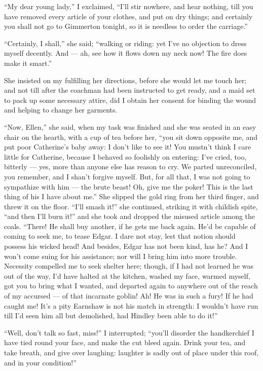 \par “My dear young lady,” I exclaimed, “I'll stir nowhere, and hear nothing, till you have removed every article of your clothes, and put on dry things; and certainly you shall not go to Gimmerton tonight, so it is needless to order the carriage.”
\par “Certainly, I shall,” she said; “walking or riding: yet I've no objection to dress myself decently. And — ah, see how it flows down my neck now! The fire does make it smart.”
\par She insisted on my fulfilling her directions, before she would let me touch her; and not till after the coachman had been instructed to get ready, and a maid set to pack up some necessary attire, did I obtain her consent for binding the wound and helping to change her garments.
\par “Now, Ellen,” she said, when my task was finished and she was seated in an easy chair on the hearth, with a cup of tea before her, “you sit down opposite me, and put poor Catherine's baby away: I don't like to see it! You mustn't think I care little for Catherine, because I behaved so foolishly on entering: I've cried, too, bitterly — yes, more than anyone else has reason to cry. We parted unreconciled, you remember, and I shan't forgive myself. But, for all that, I was not going to sympathize with him — the brute beast! Oh, give me the poker! This is the last thing of his I have about me.” She slipped the gold ring from her third finger, and threw it on the floor. “I'll smash it!” she continued, striking it with childish spite, “and then I'll burn it!” and she took and dropped the misused article among the coals. “There! He shall buy another, if he gets me back again. He'd be capable of coming to seek me, to tease Edgar. I dare not stay, lest that notion should possess his wicked head! And besides, Edgar has not been kind, has he? And I won't come suing for his assistance; nor will I bring him into more trouble. Necessity compelled me to seek shelter here; though, if I had not learned he was out of the way, I'd have halted at the kitchen, washed my face, warmed myself, got you to bring what I wanted, and departed again to anywhere out of the reach of my accursed — of that incarnate goblin! Ah! He was in such a fury! If he had caught me! It's a pity Earnshaw is not his match in strength: I wouldn't have run till I'd seen him all but demolished, had Hindley been able to do it!”
\par “Well, don't talk so fast, miss!” I interrupted; “you'll disorder the handkerchief I have tied round your face, and make the cut bleed again. Drink your tea, and take breath, and give over laughing: laughter is sadly out of place under this roof, and in your condition!”
